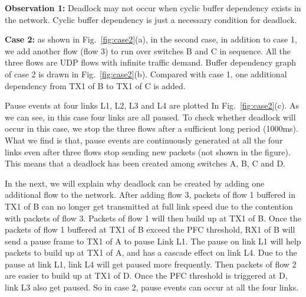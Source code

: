 %
%


\textbf{Observation 1:} Deadlock may not occur when cyclic buffer dependency exists in the network. Cyclic buffer dependency is just a necessary condition for deadlock.



\textbf{Case 2:} as shown in Fig.~\ref{fig:case2}(a), in the second case, in addition to case 1, we add another flow (flow 3) to run over switches B and C in sequence. All the three flows are UDP flows with infinite traffic demand. Buffer dependency graph of case 2 is drawn in Fig.~\ref{fig:case2}(b). Compared with case 1, one additional dependency from TX1 of B to TX1 of C is added.

Pause events at four links L1, L2, L3 and L4 are plotted In Fig.~\ref{fig:case2}(c). As we can see, in this case four links are all paused. To check whether deadlock will occur in this case, we stop the three flows after a sufficient long period (1000ms). What we find is that, pause events are continuously generated at all the four links even after three flows stop sending new packets (not shown in the figure). This means that a deadlock has been created among switches A, B, C and D.

In the next, we will explain why deadlock can be created by adding one additional flow to the network. After adding flow 3, packets of flow 1 buffered in TX1 of B can no longer get transmitted at full link speed due to the contention with packets of flow 3. Packets of flow 1 will then build up at TX1 of B. Once the packets of flow 1 buffered at TX1 of B exceed the PFC threshold, RX1 of B will send a pause frame to TX1 of A to pause Link L1. The pause on link L1 will help packets to build up at TX1 of A, and has a cascade effect on link L4. Due to the pause at link L1, link L4 will get paused more frequently. Then packets of flow 2 are easier to build up at TX1 of D. Once the PFC threshold is triggered at D, link L3 also get paused. So in case 2, pause events can occur at all the four links.

